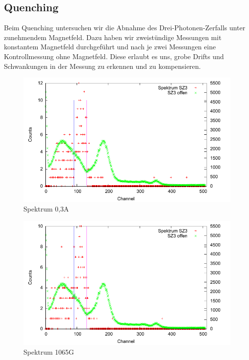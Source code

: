 \subsection{Quenching}

Beim Quenching untersuchen wir die Abnahme des Drei-Photonen-Zerfalls unter zunehmendem Magnetfeld. Dazu haben wir zweistündige Messungen mit konstantem Magnetfeld durchgeführt und nach je zwei Messungen eine Kontrollmessung ohne Magnetfeld. Diese erlaubt es uns, grobe Drifts und Schwankungen in der Messung zu erkennen und zu kompensieren.

\begin{figure}
 \includegraphics[width=\textwidth]{Graphen/quench/spektrum_0-3.pdf}
 \caption{Spektrum 0,3A}
\end{figure}

\begin{figure}
 \includegraphics[width=\textwidth]{Graphen/quench/spektrum_1065.pdf}
 \caption{Spektrum 1065G}
\end{figure}


